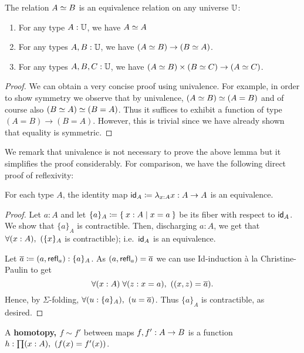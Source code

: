 \begin{lem}\label{lem:eq-rel}
The relation $\eqv A B$ is an equivalence relation on any universe $\bbU$:
\begin{enumerate}
\item For any type $A : \bbU$, we have $\eqv A A$
\item For any types $A, B : \bbU$, we have $(\eqv A B) \to (\eqv B A)$.
\item For any types $A, B, C : \bbU$, we have $(\eqv A B) \times (\eqv B C) \to (\eqv A C)$.
\end{enumerate}
\end{lem}
\begin{proof}
We can obtain a very concise proof using univalence. For example, in order to show symmetry we observe that by univalence, $\eqv {(\eqv A B)} {(A = B)}$ and of course also $\eqv {(\eqv B A)} {(B = A)}$. Thus it suffices to exhibit a function of type $(A = B) \to (B = A)$. However, this is trivial since we have already shown that equality is symmetric.
\end{proof}
We remark that univalence is not necessary to prove the above lemma but it simplifies the proof considerably. For comparison, we have the following direct proof of reflexivity:
\begin{lem}\label{lem:id-map}
For each type $A$, the identity map $\idfunc[A]\defeq \lambda_{x:A}x :A\ra A$ is an equivalence.
\end{lem}
\begin{proof}
  Let $a:A$ and let $\{a\}_A\defeq \setof{ x:A | x=a }$ be its fiber with respect to $\idfunc[A]$.
  We show that $\{ a\}_A$ is contractible.
  Then, discharging $a:A$, we get that $\fall{x:A} (\{ x\}_A$ is contractible); i.e.\ $\idfunc[A]$ is an equivalence.

  Let $\oa \defeq (a,\refl{a}):\{ a\}_A$.  As $(a,\refl{a}) = \oa$ we can use Id-induction \`{a} la Christine-Paulin to get
  \[\fall{x:A}{z:x=a} ((x,z)=\oa).\]
  Hence, by $\Sigma$-folding, $\fall{u:\{ a\}_A} (u=\oa)$.
  Thus $\{ a\}_A$ is contractible, as desired.
\end{proof}

\begin{defn}\label{defn:homotopy-between-functions}
  A \textbf{homotopy, $f\sim f'$} between maps $f,f':A\ra B$ is a function $h:\prd{x:A} (f(x)=f'(x))$.
\end{defn}

